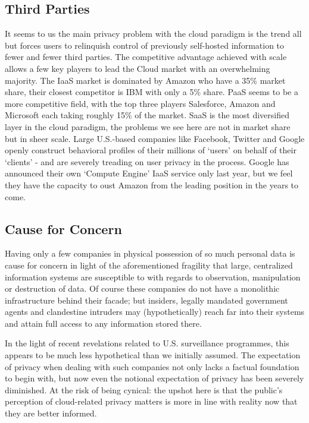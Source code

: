 \documentclass[11pt, a4paper]{article}
\begin{document}
\subsection{Third Parties}
It seems to us the main privacy problem with the cloud paradigm is the trend all but forces users to relinquish control of previously self-hosted information to fewer and fewer third parties.
The competitive advantage achieved with scale allows a few key players to lead the Cloud market with an overwhelming majority.
The IaaS market is dominated by Amazon who have a 35\% market share, their closest competitor is IBM with only a 5\% share.
PaaS seems to be a more competitive field, with the top three players Salesforce, Amazon and Microsoft each taking roughly 15\% of the market.
SaaS is the most diversified layer in the cloud paradigm, the problems we see here are not in market share but in sheer scale.
Large U.S.-based companies like Facebook, Twitter and Google openly construct behavioral profiles of their millions of `users' on behalf of their `clients' - and are severely treading on user privacy in the process.
Google has announced their own `Compute Engine' IaaS service only last year, but we feel they have the capacity to oust Amazon from the leading position in the years to come.

\subsection{Cause for Concern}
Having only a few companies in physical possession of so much personal data is cause for concern in light of the aforementioned fragility that large, centralized information systems are susceptible to with regards to observation, manipulation or destruction of data.
Of course these companies do not have a monolithic infrastructure behind their facade; but insiders, legally mandated government agents and clandestine intruders may (hypothetically) reach far into their systems and attain full access to any information stored there.

In the light of recent revelations related to U.S. surveillance programmes, this appears to be much less hypothetical than we initially assumed.
The expectation of privacy when dealing with such companies not only lacks a factual foundation to begin with, but now even the notional expectation of privacy has been severely diminished.
At the risk of being cynical: the upshot here is that the public's perception of cloud-related privacy matters is more in line with reality now that they are better informed.
\end{document}
